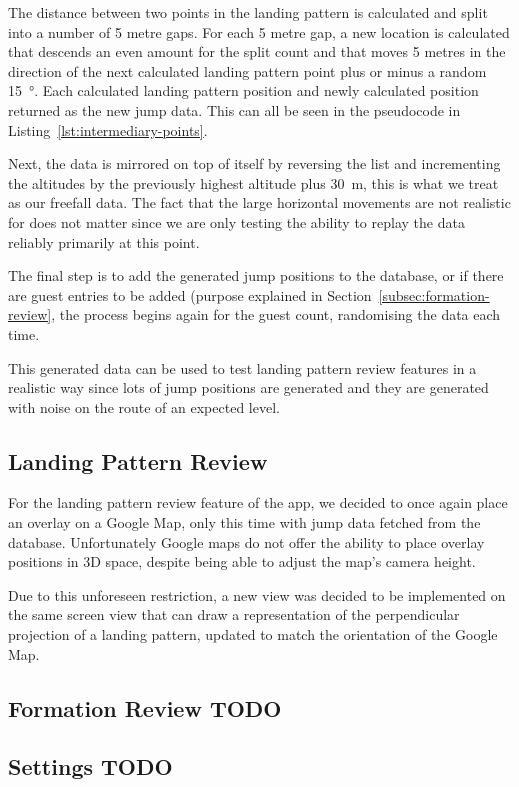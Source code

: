 The distance between two points in the landing pattern is calculated and split into a number of 5 metre gaps. For each 5 metre gap, a new location is calculated that descends an even amount for the split count and that moves 5 metres in the direction of the next calculated landing pattern point plus or minus a random \SI{15}{\degree}. Each calculated landing pattern position and newly calculated position returned as the new jump data. This can all be seen in the pseudocode in Listing~\vref{lst:intermediary-points}.

Next, the data is mirrored on top of itself by reversing the list and incrementing the altitudes by the previously highest altitude plus \SI{30}{\metre}, this is what we treat as our freefall data. The fact that the large horizontal movements are not realistic for does not matter since we are only testing the ability to replay the data reliably primarily at this point.

The final step is to add the generated jump positions to the database, or if there are guest entries to be added (purpose explained in Section~\vref{subsec:formation-review}, the process begins again for the guest count, randomising the data each time.

This generated data can be used to test landing pattern review features in a realistic way since lots of jump positions are generated and they are generated with noise on the route of an expected level.

\subsection{Landing Pattern Review}
For the landing pattern review feature of the app, we decided to once again place an overlay on a Google Map, only this time with jump data fetched from the database. Unfortunately Google maps do not offer the ability to place overlay positions in 3D space, despite being able to adjust the map's camera height.

Due to this unforeseen restriction, a new view was decided to be implemented on the same screen view that can draw a representation of the perpendicular projection of a landing pattern, updated to match the orientation of the Google Map.

\subsection{Formation Review \color{red}TODO}\label{subsec:formation-review}

\subsection{Settings \color{red}TODO}


